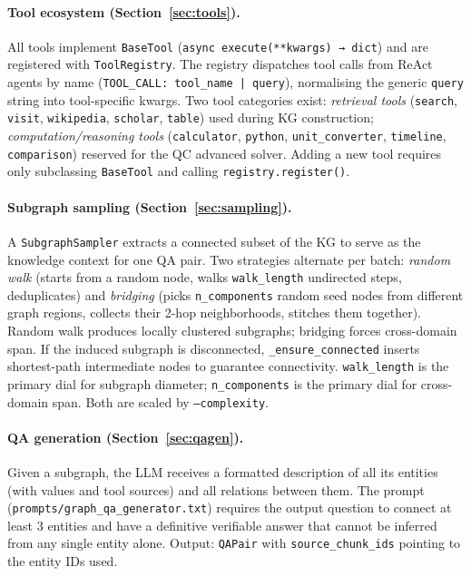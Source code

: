 \documentclass[11pt,a4paper]{article}
\begin{document}
\paragraph{Tool ecosystem (Section~\ref{sec:tools}).}
All tools implement \texttt{BaseTool} (\texttt{async execute(**kwargs) → dict}) and are registered with \texttt{ToolRegistry}. The registry dispatches tool calls from ReAct agents by name (\texttt{TOOL\_CALL: tool\_name | query}), normalising the generic \texttt{query} string into tool-specific kwargs. Two tool categories exist: \emph{retrieval tools} (\texttt{search}, \texttt{visit}, \texttt{wikipedia}, \texttt{scholar}, \texttt{table}) used during KG construction; \emph{computation/reasoning tools} (\texttt{calculator}, \texttt{python}, \texttt{unit\_converter}, \texttt{timeline}, \texttt{comparison}) reserved for the QC advanced solver. Adding a new tool requires only subclassing \texttt{BaseTool} and calling \texttt{registry.register()}.

\paragraph{Subgraph sampling (Section~\ref{sec:sampling}).}
A \texttt{SubgraphSampler} extracts a connected subset of the KG to serve as the knowledge context for one QA pair. Two strategies alternate per batch: \emph{random walk} (starts from a random node, walks \texttt{walk\_length} undirected steps, deduplicates) and \emph{bridging} (picks \texttt{n\_components} random seed nodes from different graph regions, collects their 2-hop neighborhoods, stitches them together). Random walk produces locally clustered subgraphs; bridging forces cross-domain span. If the induced subgraph is disconnected, \texttt{\_ensure\_connected} inserts shortest-path intermediate nodes to guarantee connectivity. \texttt{walk\_length} is the primary dial for subgraph diameter; \texttt{n\_components} is the primary dial for cross-domain span. Both are scaled by \texttt{--complexity}.

\paragraph{QA generation (Section~\ref{sec:qagen}).}
Given a subgraph, the LLM receives a formatted description of all its entities (with values and tool sources) and all relations between them. The prompt (\texttt{prompts/graph\_qa\_generator.txt}) requires the output question to connect at least 3 entities and have a definitive verifiable answer that cannot be inferred from any single entity alone. Output: \texttt{QAPair} with \texttt{source\_chunk\_ids} pointing to the entity IDs used.
\end{document}
